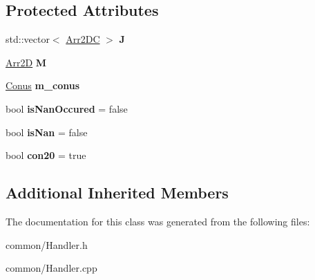 \subsection*{Protected Attributes}
\begin{DoxyCompactItemize}
\item 
\mbox{\label{class_handler_p_o_a7feb7cb39223e0eda119c7f4b6aa2ace}} 
std\+::vector$<$ \mbox{\hyperlink{class_arr2_d_c}{Arr2\+DC}} $>$ {\bfseries J}
\item 
\mbox{\label{class_handler_p_o_a158f16b20185bb8790e602e51a32e81d}} 
\mbox{\hyperlink{class_arr2_d}{Arr2D}} {\bfseries M}
\item 
\mbox{\label{class_handler_p_o_a8a23d47a3971ab91786b3ea9b861d38d}} 
\mbox{\hyperlink{struct_conus}{Conus}} {\bfseries m\+\_\+conus}
\item 
\mbox{\label{class_handler_p_o_a4719cc4f40a41adea1c1e05c60eba146}} 
bool {\bfseries is\+Nan\+Occured} = false
\item 
\mbox{\label{class_handler_p_o_a054af595516ef6050a06aa87899073e3}} 
bool {\bfseries is\+Nan} = false
\item 
\mbox{\label{class_handler_p_o_af10369da142ec20f430d2db0997994e4}} 
bool {\bfseries con20} = true
\end{DoxyCompactItemize}
\subsection*{Additional Inherited Members}


The documentation for this class was generated from the following files\+:\begin{DoxyCompactItemize}
\item 
common/Handler.\+h\item 
common/Handler.\+cpp\end{DoxyCompactItemize}
